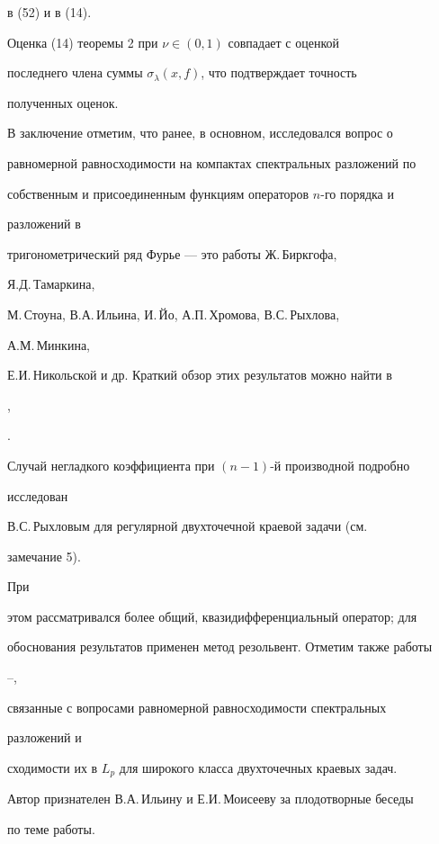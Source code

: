 {в (52) и в (14).





Оценка (14) теоремы 2 при $\nu\in(0,1)$ совпадает с оценкой


последнего члена суммы $\sigma_\lambda(x,f)$, что подтверждает точность


полученных оценок.





В заключение отметим, что ранее, в основном, исследовался вопрос о


равномерной равносходимости на компактах спектральных разложений по


собственным и присоединенным функциям операторов $n$-го порядка и


разложений в


тригонометрический ряд Фурье --- это работы Ж.\,Биркгофа,


Я.Д.\,Тамаркина,


М.\,Стоуна, В.А.\,Ильина, И.\,Йо, А.П.\,Хромова, В.С.\,Рыхлова,


А.М.\,Минкина,


Е.И.\,Никольской и др. Краткий обзор этих результатов можно найти в


\cite{12},


\cite{13}.


Случай негладкого коэффициента при $(n-1)$-й производной подробно


исследован


В.С.\,Рыхловым для регулярной двухточечной краевой задачи (см.


замечание 5).


При


этом рассматривался более общий, квазидифференциальный оператор; для


обоснования результатов применен метод резольвент. Отметим также работы


\cite{14}--\cite{17},


связанные с вопросами равномерной равносходимости спектральных


разложений и


сходимости их в $L_p$ для широкого класса двухточечных краевых задач.





Автор признателен В.А.\,Ильину и Е.И.\,Моисееву за плодотворные беседы


по теме работы.











}
